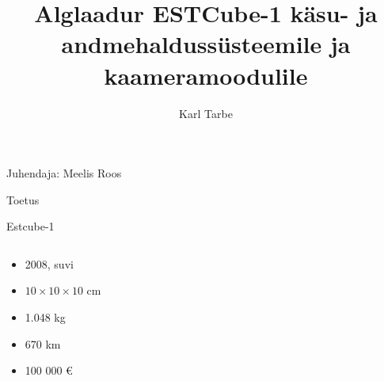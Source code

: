 \documentclass[pdf]{beamer}
\title[Alglaadur ESTCube-1 kahele moodulile]{Alglaadur ESTCube-1 käsu- ja andmehaldussüsteemile ja kaameramoodulile}
\author{Karl Tarbe}
\institute[]{Matemaatika-informaatikateaduskond}
\begin{document}
\begin{frame}[plain]
    \titlepage
    \centerline{\scriptsize Juhendaja: Meelis Roos}
\end{frame}

\begin{frame}{Toetus}
\end{frame}
\begin{frame}{Estcube-1}
    \begin{columns}
        \begin{column}{0.5\textwidth}
            \begin{itemize}
                \item 2008, suvi
                \item \(10 \times 10 \times 10\) cm
                \item 1.048 kg
                \item 670 km
                \item 100 000 \euro
            \end{itemize}
        \end{column}
        \begin{column}{0.5\textwidth}
        \end{column}
    \end{columns}
\end{frame}
\end{document}
